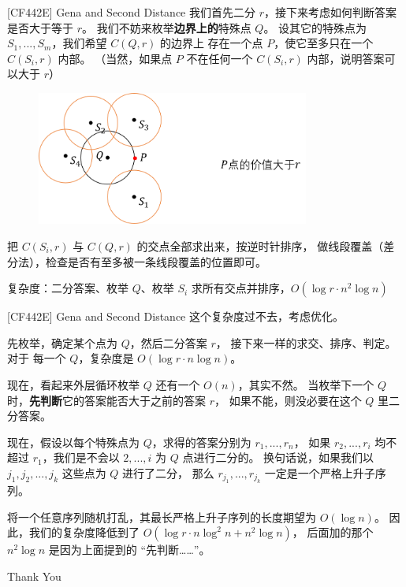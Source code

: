 \documentclass{beamer}
\begin{document}
\begin{frame}{[CF442E] Gena and Second Distance}
    \footnotesize
    我们首先二分 $r$，接下来考虑如何判断答案是否大于等于 $r$。
    我们不妨来枚举\textbf{边界上的}特殊点 $Q$。
    设其它的特殊点为 $S_1,...,S_m$，我们希望 $C(Q,r)$ 的边界上
    存在一个点 $P$，使它至多只在一个 $C(S_i,r)$ 内部。
    （当然，如果点 $P$ 不在任何一个 $C(S_i,r)$ 内部，说明答案可以大于 $r$）

    \begin{figure}[H]
        \centering
        \includegraphics[width=0.8\textwidth]{pic/cf442e.png}
    \end{figure}
    
    \pause
    把 $C(S_i,r)$ 与 $C(Q,r)$ 的交点全部求出来，按逆时针排序，
    做线段覆盖（差分法），检查是否有至多被一条线段覆盖的位置即可。

    \pause
    复杂度：二分答案、枚举 $Q$、枚举 $S_i$ 求所有交点并排序，$O(\log r \cdot n^2\log n)$
\end{frame}

\begin{frame}{[CF442E] Gena and Second Distance}
    \footnotesize
    这个复杂度过不去，考虑优化。

    \vspace{1em}\pause
    先枚举，确定某个点为 $Q$，然后二分答案 $r$，
    接下来一样的求交、排序、判定。对于
    每一个 $Q$，复杂度是 $O(\log r\cdot n\log n)$。
    
    \vspace{1em}\pause
    现在，看起来外层循环枚举 $Q$ 还有一个 $O(n)$，其实不然。
    当枚举下一个 $Q$ 时，\textbf{先判断}它的答案能否大于之前的答案 $r$，
    如果不能，则没必要在这个 $Q$ 里二分答案。

    \vspace{1em}\pause
    现在，假设以每个特殊点为 $Q$，求得的答案分别为 $r_1,...,r_n$，
    如果 $r_2,...,r_i$ 均不超过 $r_1$，我们是不会以 $2,...,i$ 为 $Q$ 点进行二分的。
    换句话说，如果我们以 $j_1,j_2,...,j_k$ 这些点为 $Q$ 进行了二分，
    那么 $r_{j_1},...,r_{j_k}$ 一定是一个严格上升子序列。

    \vspace{1em}\pause
    将一个任意序列随机打乱，其最长严格上升子序列的长度期望为 $O(\log n)$。
    因此，我们的复杂度降低到了 $O(\log r\cdot n\log^2n + n^2\log n)$，
    后面加的那个 $n^2\log n$ 是因为上面提到的 “先判断……”。
\end{frame}

\begin{frame}
    \begin{center}
        {\Huge\calligra Thank You}
    \end{center}
\end{frame}
\end{document}
